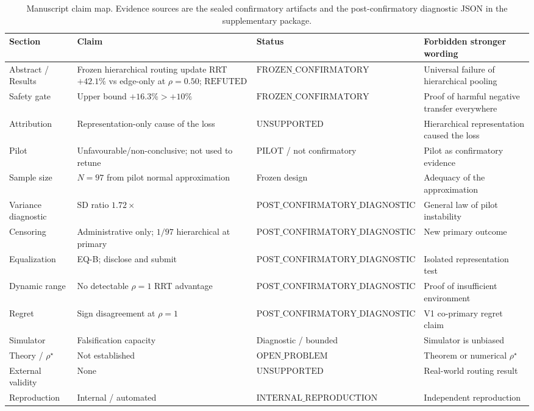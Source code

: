 \documentclass{article}
\begin{document}
\begin{table}[h]
\centering
\small
\begin{tabular}{p{3.2cm}p{3.6cm}p{2.2cm}p{3.2cm}}
\toprule
Section & Claim & Status & Forbidden stronger wording \\
\midrule
Abstract / Results & Frozen hierarchical routing update RRT $+42.1\%$ vs edge-only at $\rho=0.50$; $\mathrm{REFUTED}$ & $\mathrm{FROZEN\_CONFIRMATORY}$ & Universal failure of hierarchical pooling \\
Safety gate & Upper bound $+16.3\%>+10\%$ & $\mathrm{FROZEN\_CONFIRMATORY}$ & Proof of harmful negative transfer everywhere \\
Attribution & Representation-only cause of the loss & $\mathrm{UNSUPPORTED}$ & Hierarchical representation caused the loss \\
Pilot & Unfavourable/non-conclusive; not used to retune & $\mathrm{PILOT}$ / not confirmatory & Pilot as confirmatory evidence \\
Sample size & $N=97$ from pilot normal approximation & Frozen design & Adequacy of the approximation \\
Variance diagnostic & SD ratio $1.72\times$ & $\mathrm{POST\_CONFIRMATORY\_DIAGNOSTIC}$ & General law of pilot instability \\
Censoring & Administrative only; $1/97$ hierarchical at primary & $\mathrm{POST\_CONFIRMATORY\_DIAGNOSTIC}$ & New primary outcome \\
Equalization & EQ-B; disclose and submit & $\mathrm{POST\_CONFIRMATORY\_DIAGNOSTIC}$ & Isolated representation test \\
Dynamic range & No detectable $\rho=1$ RRT advantage & $\mathrm{POST\_CONFIRMATORY\_DIAGNOSTIC}$ & Proof of insufficient environment \\
Regret & Sign disagreement at $\rho=1$ & $\mathrm{POST\_CONFIRMATORY\_DIAGNOSTIC}$ & V1 co-primary regret claim \\
Simulator & Falsification capacity & Diagnostic / bounded & Simulator is unbiased \\
Theory / $\rho^\star$ & Not established & $\mathrm{OPEN\_PROBLEM}$ & Theorem or numerical $\rho^\star$ \\
External validity & None & $\mathrm{UNSUPPORTED}$ & Real-world routing result \\
Reproduction & Internal / automated & $\mathrm{INTERNAL\_REPRODUCTION}$ & Independent reproduction \\
\bottomrule
\end{tabular}
\caption{Manuscript claim map. Evidence sources are the sealed confirmatory artifacts and the post-confirmatory diagnostic JSON in the supplementary package.}
\label{tab:claims}
\end{table}
\end{document}
